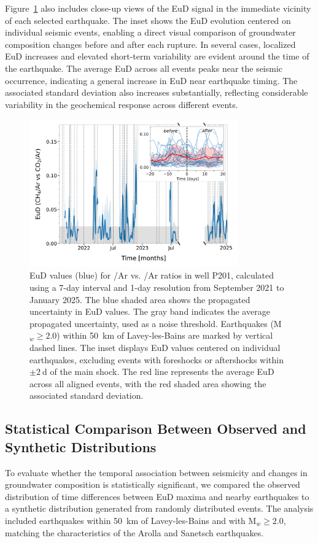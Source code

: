 Figure~\ref{fig:EuD_EuD7} also includes close-up views of the EuD signal in the immediate vicinity of each selected earthquake.
The inset shows the EuD evolution centered on individual seismic events, enabling a direct visual comparison of groundwater composition changes before and after each rupture.
In several cases, localized EuD increases and elevated short-term variability are evident around the time of the earthquake.
The average EuD across all events peaks near the seismic occurrence, indicating a general increase in EuD near earthquake timing.
The associated standard deviation also increases substantially, reflecting considerable variability in the geochemical response across different events.

\begin{figure}[H]
    \centering
    \includegraphics[width=0.8\textwidth]{chapters/04_chap3/figures/full_EuD_7_article.pdf}
    \caption{
    EuD values (blue) for /Ar vs. /Ar ratios in well P201, calculated using a 7-day interval and 1-day resolution from September 2021 to January 2025.
    The blue shaded area shows the propagated uncertainty in EuD values.
    The gray band indicates the average propagated uncertainty, used as a noise threshold.
    Earthquakes (M$_w \geq 2.0$) within \SI{50}{\kilo\meter} of Lavey-les-Bains are marked by vertical dashed lines.
    The inset displays EuD values centered on individual earthquakes, excluding events with foreshocks or aftershocks within $\pm \SI{2}{\day}$ of the main shock.
    The red line represents the average EuD across all aligned events, with the red shaded area showing the associated standard deviation.
    }
    \label{fig:EuD_EuD7}
\end{figure}

\subsection{Statistical Comparison Between Observed and Synthetic Distributions}
To evaluate whether the temporal association between seismicity and changes in groundwater composition is statistically significant, we compared the observed distribution of time differences between EuD maxima and nearby earthquakes to a synthetic distribution generated from randomly distributed events.
The analysis included earthquakes within \SI{50}{\kilo\meter} of Lavey-les-Bains and with M$_w \geq 2.0$, matching the characteristics of the Arolla and Sanetsch earthquakes.

